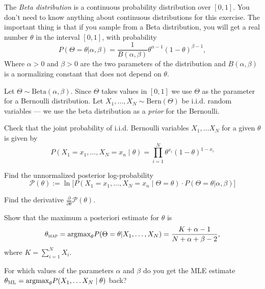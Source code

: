 \documentclass[a4paper,10pt,landscape,twocolumn]{scrartcl}
\begin{document}
\begin{exercise}
	The \emph{Beta distribution} is a continuous probability distribution over $[0,1]$. You don't need to know anything about continuous distributions for this exercise. The important thing is that if you sample from a Beta distribution, you will get a real number $\theta$ in the interval $[0, 1]$, with probability
	\[
		P(\Theta = \theta|\alpha, \beta) = \frac{1}{B(\alpha, \beta)} \theta^{\alpha-1} (1-\theta)^{\beta-1},
	\] 
	Where $\alpha > 0$ and $\beta > 0$ are the two parameters of the distribution and $B(\alpha, \beta)$ is a normalizing constant that does not depend on $\theta$.

	Let $\Theta \sim \text{Beta}(\alpha, \beta)$. Since $\Theta$ takes values in $[0,1]$ we use $\Theta$ as the parameter for a Bernoulli distribution. Let $X_1, \dots, X_N \sim \text{Bern}(\Theta)$ be i.i.d. random variables --- we use the beta distribution as a \emph{prior} for the Bernoulli.
	
	\begin{subex}
	Check that the joint probability of i.i.d. Bernoulli variables $X_1, \dots X_N$ for a given $\theta$ is given by
	\[
	P(X_1=x_1, \dots, X_N=x_n \mid \theta) = \prod_{i=1}^N \theta^{x_i} (1-\theta)^{1-x_i}
	\]	
	\end{subex}

	\begin{subex}
		Find the unnormalized posterior log-probability 
		\[
			\mathcal P(\theta) := \ln \bigl[ P(X_1=x_1, \dots, X_N=x_n \mid \Theta=\theta) \cdot P(\Theta = \theta| \alpha, \beta)\bigr]
		\]
	\end{subex}

	\begin{subex}
	Find the derivative $\frac{\partial}{\partial \theta} \mathcal P(\theta)$.	
	\end{subex}
	
	\begin{subex}
	Show that the maximum a posteriori estimate 	for $\theta$ is 
	\[
		\theta_\textsc{map} 
			= \text{argmax}_\theta P(\Theta = \theta | X_1, \dots, X_N)
			= \frac{K + \alpha - 1}{N + \alpha + \beta - 2}, 
	\]
	where $K = \sum_{i=1}^N X_i$.
	\end{subex}
	
	\begin{subex}
		For which values of the parameters $\alpha$ and $\beta$ do you get the MLE estimate $\theta_\textsc{ML} = \text{argmax}_\theta P(X_1, \dots X_N \mid \theta)$ back? 
	\end{subex}


\end{exercise}
\end{document}
